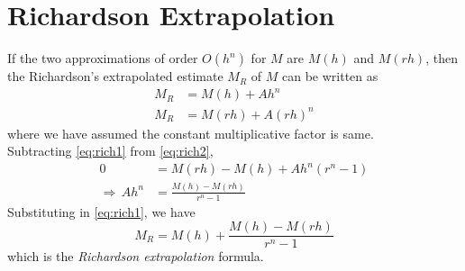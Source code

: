 \documentclass[12pt,class=book,crop=false]{standalone}
\begin{document}
\section{Richardson Extrapolation}
If the two approximations of order $ O(h^n) $ for $ M $ are $ M(h) $ and $ M(rh) $, then the Richardson's extrapolated estimate $ M_R $ of $ M $ can be written as
\begin{align}
    M_R & =M(h)+Ah^n\label{eq:rich1}     \\
    M_R & =M(rh)+A(rh)^n\label{eq:rich2}
\end{align}
where we have assumed the constant multiplicative factor is same.\\
Subtracting \eqref{eq:rich1} from \eqref{eq:rich2},
\begin{align*}
    0                  & =M(rh)-M(h)+Ah^n (r^n-1)  \\
    \Rightarrow\, Ah^n & =\frac{M(h)-M(rh)}{r^n-1}
\end{align*}
Substituting in \eqref{eq:rich1}, we have
\[
    M_R=M(h)+\frac{M(h)-M(rh)}{r^n-1}
\]
which is the \emph{Richardson extrapolation} formula.
\end{document}
